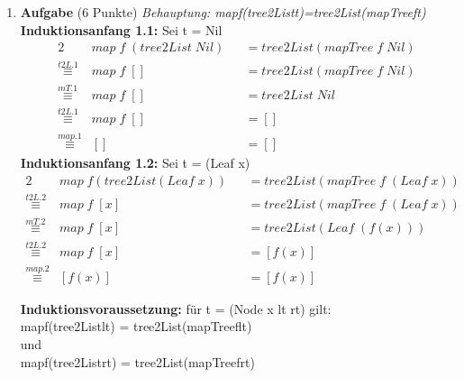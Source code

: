 \documentclass[11pt]{article}
\newcommand{\punkte}[1]{{\small{ }(#1 Punkte)}}
\newcommand{\aufgabe}[1]{\item{\bf #1}}
\begin{document}
\begin{enumerate}
 \aufgabe{Aufgabe}\punkte{6}
\vspace*{0.5cm}
\textit{Behauptung: map\phantom{.}f(tree2List\phantom{.}t)\phantom{.}=\phantom{.}tree2List(mapTree\phantom{.}f\phantom{.}t)}\\
\textbf{Induktionsanfang 1.1:} Sei t = Nil
\begin{alignat*}{2}
&map\phantom{.}f\phantom{.}(tree2List\phantom{.}Nil)&&=tree2List(mapTree\phantom{.}f\phantom{.}Nil)\\
\stackrel{t2L.1}{\equiv}&map\phantom{.}f\phantom{.}[]&&=tree2List(mapTree\phantom{.}f\phantom{.}Nil)\\
\stackrel{mT.1}{\equiv}&map\phantom{.}f\phantom{.}[]&&=tree2List\phantom{.}Nil\\
\stackrel{t2L.1}{\equiv}&map\phantom{.}f\phantom{.}[]&&=[]\\
\stackrel{map.1}{\equiv}&[]&&=[]
\end{alignat*}
\textbf{Induktionsanfang 1.2:} Sei t = (Leaf x)
\begin{alignat*}{2}
&map\phantom{.}f(tree2List(Leaf\phantom{.}x))&&=tree2List(mapTree\phantom{.}f\phantom{.}(Leaf\phantom{.}x))\\
\stackrel{t2L.2}{\equiv}&map\phantom{.}f\phantom{.}[x]&&=tree2List(mapTree\phantom{.}f\phantom{.}(Leaf\phantom{.}x))\\
\stackrel{mT.2}{\equiv}&map\phantom{.}f\phantom{.}[x]&&=tree2List(Leaf\phantom{.}(f(x)))\\
\stackrel{t2L.2}{\equiv}&map\phantom{.}f\phantom{.}[x]&&=[f(x)]\\
\stackrel{map.2}{\equiv}&[f(x)]&&=[f(x)]
\end{alignat*}

\vspace*{0.5cm}
\textbf{Induktionsvoraussetzung:} für t = (Node x lt rt) gilt:\\
map\phantom{.}f\phantom{.}(tree2List\phantom{.}lt) = tree2List(mapTree\phantom{.}f\phantom{.}lt)\\
\phantom{Kriegel }und\\
map\phantom{.}f\phantom{.}(tree2List\phantom{.}rt) = tree2List(mapTree\phantom{.}f\phantom{.}rt)\\


\end{enumerate}
\end{document}
